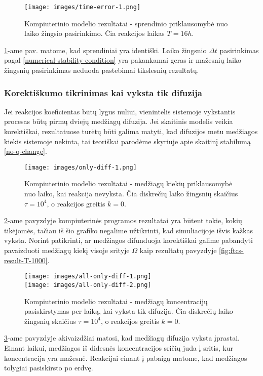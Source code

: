\begin{figure}[h!]

\centering

\texttt{[image: images/time-error-1.png]}

\caption{Kompiuterinio modelio rezultatai - sprendinio priklausomybė nuo laiko žingsio pasirinkimo. Čia reakcijos laikas $T=16h$.}

\label{time-error}

\end{figure}

\ref{time-error}-ame pav. matome, kad sprendiniai yra identiški. Laiko žingsnio  $\Delta t$ pasirinkimas pagal \eqref{numerical-stability-condition} yra pakankamai geras ir mažesnių laiko žingsnių pasirinkimas neduoda pastebimai tikslesnių rezultatų.

\newpage
\subsubsection*{Korektiškumo tikrinimas kai vyksta tik difuzija}

Jei reakcijos koeficientas būtų lygus nuliui, vienintelis sistemoje vykstantis procesas būtų pirmų dviejų medžiagų difuzija. Jei skaitinis modelis veikia korektiškai, rezultatuose turėtų būti galima matyti, kad difuzijos metu medžiagos kiekis sistemoje nekinta, tai teoriškai parodėme skyriuje apie skaitinį stabilumą \eqref{no-q-change}.

\begin{figure}[h!]
    \centering
    \texttt{[image: images/only-diff-1.png]}
    \caption{Kompiuterinio modelio rezultatai - medžiagų kiekių priklausomybė nuo laiko, kai reakcija nevyksta. Čia diskrečių laiko žingsnių skaičius $\tau=10^4$, o reakcijos greitis $k = 0$. }
    \label{no-reaction}
\end{figure}

\ref{no-reaction}-ame pavyzdyje kompiuterinės programos rezultatai yra būtent tokie, kokių tikėjomės, tačiau iš šio grafiko negalime užtikrinti, kad simuliacijoje išvis kažkas vyksta. Norint patikrinti, ar medžiagos difunduoja korektiškai galime pabandyti pavaizduoti medžiagų kiekį visoje srityje $\Omega$ kaip rezultatų pavyzdyje \eqref{fig:ftcs-result-T-1000}.

\begin{figure}[h!]
\centering
\texttt{[image: images/all-only-diff-1.png]} \\
\texttt{[image: images/all-only-diff-2.png]}

\caption{Kompiuterinio modelio rezultatai - medžiagų koncentracijų pasiskirstymas per laiką, kai vyksta tik difuzija. Čia diskrečių laiko žingsnių skaičius $\tau=10^4$, o reakcijos greitis $k = 0$. }

\label{only-diffusion}
\end{figure}

\ref{only-diffusion}-ame pavyzdyje akivaizdžiai matosi, kad medžiagų difuzija vyksta įprastai. Einant laikui, medžiagos iš didesnės koncentracijos sričių juda į sritis, kur koncentracija yra mažesnė. Reakcijai einant į pabaigą matome, kad medžiagos tolygiai pasiskirsto po erdvę.


